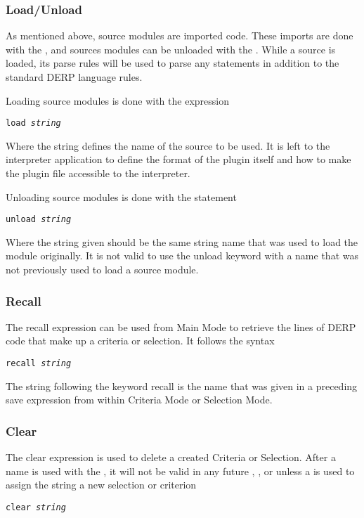 \subsubsection{Load/Unload}
As mentioned above, source modules are imported code. These imports are done with the ,
and sources modules can be unloaded with the . While a source is loaded, its parse
rules will be used to parse any statements in addition to the standard DERP language rules.

Loading source modules is done with the expression
\begin{description}[labelindent=1cm,leftmargin=\onelen,labelwidth=1cm]
     \texttt{load \textit{string}}
\end{description}

Where the string defines the name of the source to be used. It is left to the interpreter application to define
the format of the plugin itself and how to make the plugin file accessible to the interpreter.

Unloading source modules is done with the statement
\begin{description}[labelindent=1cm,leftmargin=\onelen,labelwidth=1cm]
     \texttt{unload \textit{string}}
\end{description}

Where the string given should be the same string name that was used to load the module originally.
It is not valid to use the unload keyword with a name that was not previously used to load a source module.



\subsubsection{Recall}
The recall expression can be used from Main Mode to retrieve the lines of DERP code that make up a
criteria or selection. It follows the syntax
\begin{description}[labelindent=1cm,leftmargin=\onelen,labelwidth=1cm]
     \texttt{recall \textit{string}}
\end{description}

The string following the keyword recall is the name that was given in a preceding save expression from
within Criteria Mode or Selection Mode.

\subsubsection{Clear}
The clear expression is used to delete a created Criteria or Selection. After a name is used with the
, it will not be valid in any future , , or 
unless a  is used to assign the string a new selection or criterion
\begin{description}[labelindent=1cm,leftmargin=\onelen,labelwidth=1cm]
     \texttt{clear \textit{string}}
\end{description}

